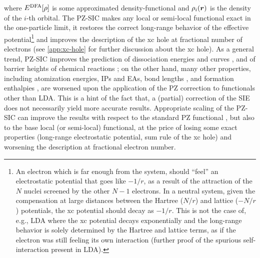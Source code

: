 where $E^{\rm DFA}[\rho]$ is some approximated density-functional and $\rho_i({\bm r})$ is the density of the $i$-th orbital. The PZ-SIC makes any local or semi-local functional exact in the one-particle limit, it restores the correct long-range behavior of the effective potential\footnote{An electron which is far enough from the system, should ``feel'' an electrostatic potential that goes like $-1/r$, as a result of the attraction of the $N$ nuclei screened by the other $N-1$ electrons. In a neutral system, given the compensation at large distances between the Hartree ($N/r$) and lattice ($-N/r$) potentials, the xc potential should decay as $-1/r$. This is not the case of, e.g., LDA where the xc potential decays exponentially and the long-range behavior is solely determined by the Hartree and lattice terms, as if the electron was still feeling its own interaction (further proof of the spurious self-interaction present in LDA).} and improves the description of the xc hole at fractional number of electrons \cite{perdew_what_1985} (see \cref{app:xc-hole} for further discussion about the xc hole). As a general trend, PZ-SIC improves the prediction of dissociation energies and curves \cite{ruzsinszky_density_2007}, and of barrier heights of chemical reactions \cite{vydrov_scaling_2006}; on the other hand, many other properties, including atomization energies, IPs and EAs, bond lengths \cite{vydrov_scaling_2006}, and formation enthalpies \cite{vydrov_effect_2004}, are worsened upon the application of the PZ correction to functionals other than LDA. This is a hint of the fact that, a (partial) correction of the SIE does not necessarily yield more accurate results. Appropriate scaling of the PZ-SIC can improve the results with respect to the standard PZ functional \cite{klupfel_effect_2012}, but also to the base local (or semi-local) functional, at the price of losing some exact properties (long-range electrostatic potential, sum rule of the xc hole) \cite{ruzsinszky_density_2007} and worsening the description at fractional electron number.

